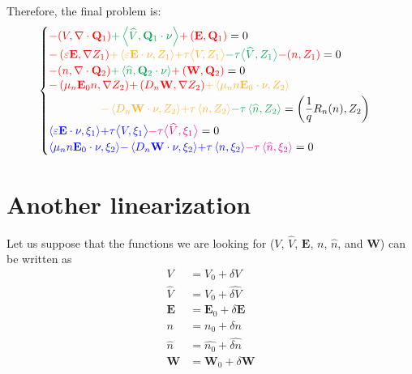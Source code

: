 \documentclass[a4paper,12pt, draft]{article}
\newcommand{\diver}[1]{\ensuremath{\nabla \cdot #1}}
\begin{document}
Therefore, the final problem is:
\[
 \begin{cases}
  {\color{red} -(V, \diver{\mathbf{Q}_{1}})}
      {\color{Green} + \left<\widehat{V}, \mathbf{Q}_{1} \cdot \nu \right>}
      {\color{red} + \left(\mathbf{E}, \mathbf{Q}_{1} \right)} = 0 \\
  {\color{red} - \left(\varepsilon \mathbf{E}, \nabla Z_{1}\right)}
      {\color{Dandelion} + \left<\varepsilon \mathbf{E} \cdot \nu, Z_{1}\right>}
      {\color{Dandelion} + \tau \big< V , Z_{1} \big> }
      {\color{Green} - \tau \big< \widehat{V}, Z_{1} \big>}
      {\color{red} - (n,Z_{1})} = 0 \\
  {\color{red} -(n, \diver{\mathbf{Q}_{2}})}
      {\color{Green} + \left<\widehat{n}, \mathbf{Q}_{2} \cdot \nu \right>}
      {\color{red} + \left(\mathbf{W}, \mathbf{Q}_{2} \right)} = 0 \\
  \begin{aligned}
      {\color{red} - \left(\mu_n \mathbf{E}_{0} n, \nabla Z_{2} \right)}
          {\color{red} + \left( D_n \mathbf{W}, \nabla Z_{2} \right)}
          {\color{Dandelion} + \left<\mu_n n \mathbf{E}_{0} \cdot \nu, Z_{2} \right>}
          \hphantom{- \left< D_n \mathbf{W} \cdot \nu, Z_{2} \right> } \\
      {\color{Dandelion} - \left< D_n \mathbf{W} \cdot \nu, Z_{2} \right>}
          {\color{Dandelion} + \tau \left<n, Z_{2}\right> }
          {\color{Green} - \tau \left<\widehat{n}, Z_{2}\right>} =
          {\left(\frac{1}{q}R_n(n), Z_2\right)}
  \end{aligned} \\
  {\color{blue} \left<\varepsilon \mathbf{E} \cdot \nu, \xi_{1}\right>}
      {\color{blue} + \tau \big< V, \xi_{1}\big>}
      {\color{Magenta} - \tau \big<\widehat{V}, \xi_{1} \big>} = 0 \\
  {\color{blue} \left<\mu_n n \mathbf{E}_{0} \cdot \nu, \xi_{2} \right>}
      {\color{blue} -\left<D_n \mathbf{W} \cdot \nu, \xi_{2} \right>}
      {\color{blue} + \tau \left< n, \xi_{2} \right>}
      {\color{Magenta} - \tau \left<\widehat{n}, \xi_{2} \right>} = 0
 \end{cases}
\]

\section{Another linearization}
Let us suppose that the functions we are looking for ($V$, $\widehat{V}$, $\mathbf{E}$, $n$,
$\widehat{n}$, and $\mathbf{W}$) can be written as
\[
 \begin{split}
    V           & = V_{0} + \delta V \\
    \widehat{V} & = \widehat{V_{0}} + \widehat{\delta V} \\
    \mathbf{E}  & = \mathbf{E}_{0} + \delta \mathbf{E} \\
    n           & = n_{0} + \delta n \\
    \widehat{n} & = \widehat{n_{0}} + \widehat{\delta n} \\
    \mathbf{W}  & = \mathbf{W}_{0} + \delta \mathbf{W}
 \end{split}
\]
\end{document}
